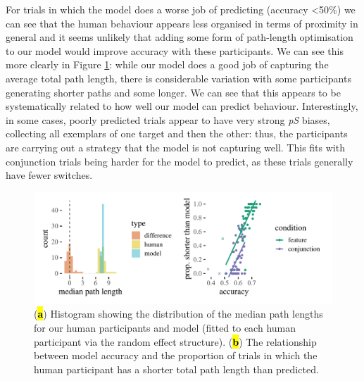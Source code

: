 \documentclass[vision,article,accept,pdftex,moreauthors]{Definitions/mdpi}
\begin{document}
For trials in which the model does a worse job of predicting (accuracy <50$\%$) we can see that the human behaviour appears less organised in terms of proximity in general and it seems unlikely that adding some form of path-length optimisation to our model would improve accuracy with these participants. We can see this more clearly in Figure \ref{fig:qjep_path_lengths}: while our model does a good job of capturing the average total path length, there is considerable variation with some participants generating shorter paths and some longer. We can see  that this appears to be systematically related to how well our model can predict behaviour. Interestingly, in some cases, poorly predicted trials appear to have very strong \textit{pS} biases, collecting all exemplars of one target and then the other: thus, the participants are carrying out a strategy that the model is not capturing well. This fits with conjunction trials being harder for the model to predict, as these trials generally have fewer switches. 
\vspace{-10pt}
\begin{figure}[H]
\includegraphics[width=13.5 cm]{Figures/path_length.pdf}
\caption{({\textbf{\hl{a}}}) Histogram showing the distribution of the median path lengths for our human participants and model (fitted to each human participant via the random effect structure). (\textbf{\hl{b}}) The relationship between model accuracy and the proportion of trials in which the human participant has a shorter total path length than predicted.}%

\label{fig:qjep_path_lengths}
\end{figure} 
\end{document}
